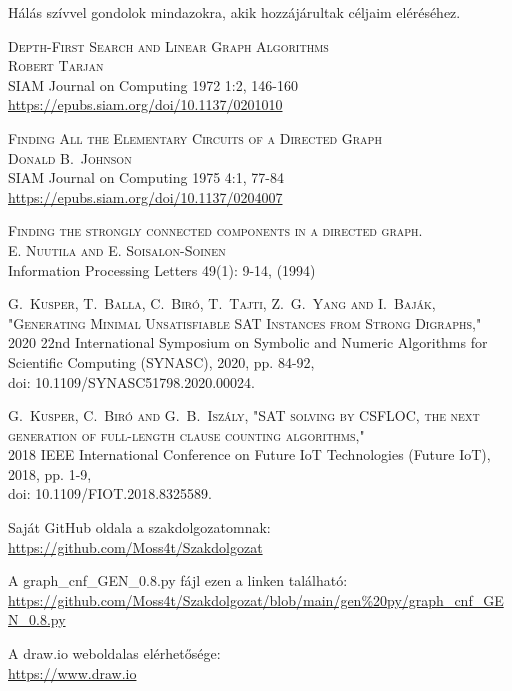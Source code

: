 \documentclass[
]{thesis-ekf}
\theoremstyle{definition}
\theoremstyle{remark}
\begin{document}
	Hálás szívvel gondolok mindazokra, akik hozzájárultak céljaim eléréséhez.
	
\begin{thebibliography}{2}

	\textsc{Depth-First Search and Linear Graph Algorithms
	\\Robert Tarjan}
	\\SIAM Journal on Computing 1972 1:2, 146-160
	\\\url{https://epubs.siam.org/doi/10.1137/0201010}

	\textsc{Finding All the Elementary Circuits of a Directed Graph
	\\Donald B.~Johnson}
	\\SIAM Journal on Computing 1975 4:1, 77-84
	\\\url{https://epubs.siam.org/doi/10.1137/0204007}
	
	\textsc{Finding the strongly connected components in a directed graph.}
	\\\textsc{E. Nuutila and E. Soisalon-Soinen }
	\\Information Processing Letters 49(1): 9-14, (1994)
	
	\textsc{G.~Kusper, T.~Balla, C.~Biró, T.~Tajti, Z.~G.~Yang and I.~Baják, "Generating Minimal Unsatisfiable SAT Instances from Strong Digraphs,"}
	\\2020 22nd International Symposium on Symbolic and Numeric Algorithms for Scientific Computing (SYNASC), 2020, pp. 84-92, 
	\\doi: 10.1109/SYNASC51798.2020.00024.
	
	\textsc{G.~Kusper, C.~Biró and G.~B.~Iszály, "SAT solving by CSFLOC, the next generation of full-length clause counting algorithms,"}
	\\2018 IEEE International Conference on Future IoT Technologies (Future IoT), 2018, pp. 1-9, 
	\\doi: 10.1109/FIOT.2018.8325589.
	
	Saját GitHub oldala a szakdolgozatomnak:
	\\\url{https://github.com/Moss4t/Szakdolgozat}
	
	A graph\_cnf\_GEN\_0.8.py fájl ezen a linken található:
	\\\url{https://github.com/Moss4t/Szakdolgozat/blob/main/gen%20py/graph_cnf_GEN_0.8.py}
		
	A draw.io weboldalas elérhetősége:
	\\\url{https://www.draw.io}
	

\end{thebibliography}
\end{document}
